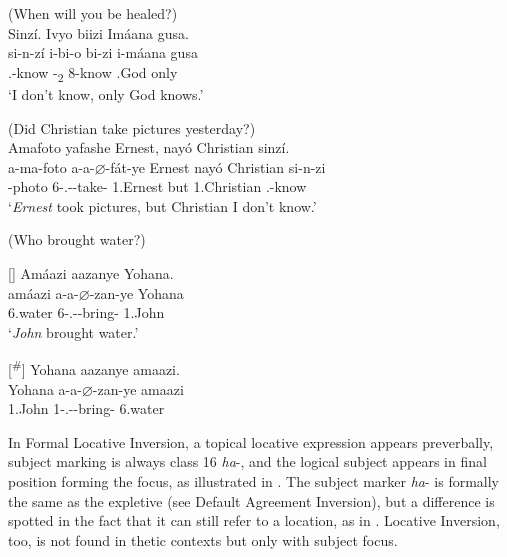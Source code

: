 \documentclass[output=paper]{langscibook}
\begin{document}
\ea
\label{bkm:Ref73976448}
(When will you be healed?)\\
Sinzí. Ivyo biizi Imáana gusa.\\
\gll
si-n-zí  i-bi-o  bi-zi  i-máana  gusa\\
\SG.\SM{}-know  -\DEM{}\textsubscript{2}  8\SM-{}know  .God  only\\
\glt
‘I don’t know, only God knows.’\\

\z

\ea
(Did Christian take pictures yesterday?)\\
Amafoto yafashe Ernest, nayó Christian sinzí.\\
\gll
a-ma-foto  a-a-$\varnothing$-fát-ye  Ernest  nayó  Christian  si-n-zi\\
-{}photo  6\SM-\N.\PST-\CJ{}-take-\PFV{}  1.Ernest  but  1.Christian  \SG.\SM{}-know\\
\glt
‘\textit{Ernest} took pictures, but Christian I don’t know.’\\

\z

\ea
\label{bkm:Ref75346778}
\label{bkm:Ref141643390}(Who brought water?)

\ea
[]{
Amáazi  aazanye  Yohana.\\
\gll
amáazi  a-a-$\varnothing$-zan-ye  Yohana\\
6.water  6\SM-\N.\PST-\CJ{}-bring-\PFV{}  1.John\\
\glt
  ‘\textit{John} brought water.’\\
}

\ex
[\textsuperscript{\#}]{
Yohana  aazanye  amaazi.\\
\gll
Yohana  a-a-$\varnothing$-zan-ye  amaazi\\
1.John  1\SM-\N.\PST-\CJ{}-bring-\PFV{}  6.water\\
\glt
}


\z
\z

In Formal Locative Inversion, a topical locative expression appears preverbally, subject marking is always class 16 \textit{ha}-, and the logical subject appears in final position forming the focus, as illustrated in . The subject marker \textit{ha}- is formally the same as the expletive (see Default Agreement Inversion), but a difference is spotted in the fact that it can still refer to a location, as in . Locative Inversion, too, is not found in thetic contexts but only with subject focus.
\end{document}
